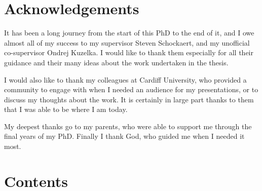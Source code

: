 \documentclass[a4paper,oneside,onecolumn,openright,12pt]{book}
\makeatletter
\def\baselinestretch{1.5}
\def\contentsname{Contents}
\renewcommand\tableofcontents{%
    \if@twocolumn%
      \@restonecoltrue\onecolumn%
    \else%
      \@restonecolfalse%
    \fi%
    \chapter*{\contentsname}%
    \@starttoc{toc}%
    \if@restonecol\twocolumn\fi%
    }
\newcounter{algorithm}[chapter]
\newcommand\listalgorithmsname{List of Algorithms}
\newcommand\listofalgorithms{%
    \if@twocolumn
      \@restonecoltrue\onecolumn
    \elsea
      \@restonecolfalse
    \fi
    \chapter*{\listalgorithmsname}%
      \@mkboth{\listalgorithmsname}{\listalgorithmsname}%
    \@starttoc{loa}%
    \if@restonecol\twocolumn\fi
    }
\renewcommand\listoffigures{%
    \if@twocolumn
      \@restonecoltrue\onecolumn
    \else
      \@restonecolfalse
    \fi
    \chapter*{\listfigurename}%
      \@mkboth{\listfigurename}{\listfigurename}%
    \@starttoc{lof}%
    \if@restonecol\twocolumn\fi
    }
\renewcommand\listoftables{%
    \if@twocolumn
      \@restonecoltrue\onecolumn
    \else
      \@restonecolfalse
    \fi
    \chapter*{\listtablename}%
      \@mkboth{\listtablename}{\listtablename}%
    \@starttoc{lot}%
    \if@restonecol\twocolumn\fi
    }
\makeatother
\begin{document}
  















\def\baselinestretch{1.5}\normalfont


\chapter*{Acknowledgements}

It has been a long journey from the start of this PhD to the end of it, and I owe almost all of my success to my supervisor Steven Schockaert, and my unofficial co-supervisor Ondrej Kuzelka. I would like to thank them especially for all their guidance and their many ideas about the work undertaken in the thesis.

I would also like to thank my colleagues at Cardiff University, who provided a community to engage with when I needed an audience for my presentations, or to discuss my thoughts about the work. It is certainly in large part thanks to them that I was able to be where I am today.

My deepest thanks go to my parents, who were able to support me through the final years of my PhD. Finally I thank God, who guided me when I needed it most.

\tableofcontents



\listoffigures

\listoftables


%

\mainmatter







\backmatter 



\end{document}
